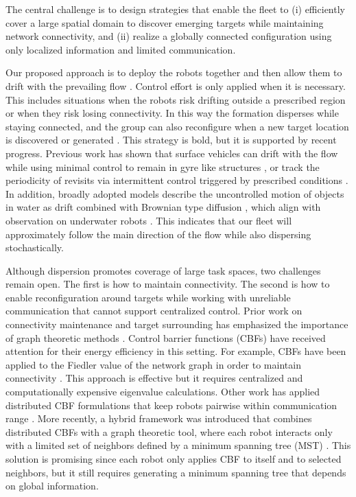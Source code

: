 \documentclass[conference]{IEEEconf}
\theoremstyle{plain}
\begin{document}
The central challenge is to design strategies that enable the fleet to (i) efficiently cover a large spatial domain to discover emerging targets while maintaining network connectivity, and (ii) realize a globally connected configuration using only localized information and limited communication.

Our proposed approach is to deploy the robots together and then allow them to drift with the prevailing flow . Control effort is only applied when it is necessary. This includes situations when the robots risk drifting outside a prescribed region or when they risk losing connectivity. In this way the formation disperses while staying connected, and the group can also reconfigure when a new target location is discovered or generated \cite{butler2025}. This strategy is bold, but it is supported by recent progress. Previous work has shown that surface vehicles can drift with the flow while using minimal control to remain in gyre like structures \cite{wei2019}, or track the periodicity of revisits via intermittent control triggered by prescribed conditions \cite{knizhnik2022}. In addition, broadly adopted models describe the uncontrolled motion of objects in water as drift combined with Brownian type diffusion \cite{taylor1922, okubo1971, majda1999}, which align with observation on underwater robots \cite{berlinger2021, quattrini2023}. This indicates that our fleet will approximately follow the main direction of the flow while also dispersing stochastically.

Although dispersion promotes coverage of large task spaces, two challenges remain open. The first is how to maintain connectivity. The second is how to enable reconfiguration around targets while working with unreliable communication that cannot support centralized control. Prior work on connectivity maintenance and target surrounding has emphasized the importance of graph theoretic methods \cite{olfati2007,dimartino2006}. Control barrier functions (CBFs) have received attention for their energy efficiency in this setting. For example, CBFs have been applied to the Fiedler value of the network graph in order to maintain connectivity \cite{capelli2020}. This approach is effective but it requires centralized and computationally expensive eigenvalue calculations. Other work has applied distributed CBF formulations that keep robots pairwise within communication range \cite{sabattini2013,capelli2021}. More recently, a hybrid framework was introduced that combines distributed CBFs with a graph theoretic tool, where each robot interacts only with a limited set of neighbors defined by a minimum spanning tree (MST) \cite{yang2023}. This solution is promising since each robot only applies CBF to itself and to selected neighbors, but it still requires generating a minimum spanning tree that depends on global information.
\end{document}
